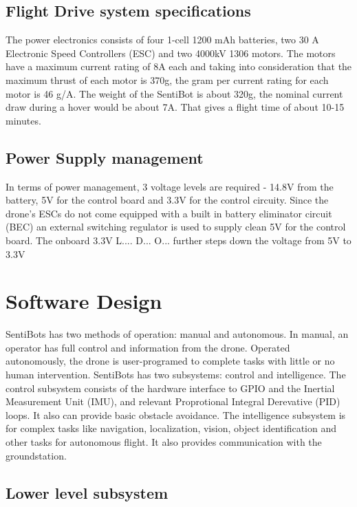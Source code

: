 \documentclass[12pt]{article}
\begin{document}
\subsection{Flight Drive system specifications}

The power electronics consists of four 1-cell 1200 mAh batteries, two 30 A Electronic Speed Controllers (ESC) and two 4000kV 1306 motors. The motors have a maximum current rating of 8A each and taking into consideration that the maximum thrust of each motor is 370g, the gram per current rating for each motor is 46 g/A. The weight of the SentiBot is about 320g, the nominal current draw during a hover would be about 7A. That gives a flight time of about 10-15 minutes. 

\subsection{Power Supply management}

In terms of power management, 3 voltage levels are required - 14.8V from the battery, 5V for the control board and 3.3V for the control circuity. Since the drone’s ESCs do not come equipped with a built in battery eliminator circuit (BEC) an external switching regulator is used to supply clean 5V for the control board. The onboard 3.3V L.... D... O... further steps down the voltage from 5V to 3.3V

\section{Software Design}

SentiBots has two methods of operation: manual and autonomous. In manual, an operator has full control and information from the drone. Operated autonomously, the drone is user-programed to complete tasks with little or no human intervention. SentiBots has two subsystems: control and intelligence. The control subsystem consists of the hardware interface to GPIO and the Inertial Measurement Unit (IMU), and relevant Proprotional Integral Derevative (PID) loops. It also can provide basic obstacle avoidance. The intelligence subsystem is for complex tasks like navigation, localization, vision, object identification and other tasks for autonomous flight. It also provides communication with the groundstation.

\subsection{Lower level subsystem}
\end{document}
